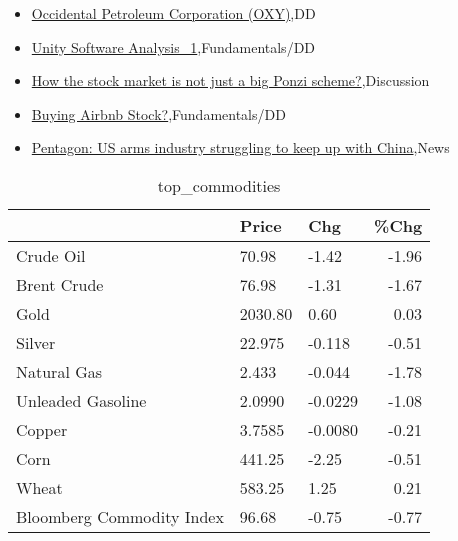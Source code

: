 \documentclass{article}%
\begin{document}
%
\begin{itemize}%
\item%
\href{https://reddit.com/r/wallstreetbets/comments/198ucu8/occidental\_petroleum\_corporation\_oxy/}{Occidental Petroleum Corporation (OXY)},DD%
\item%
\href{https://reddit.com/r/StockMarket/comments/198umep/unity\_software\_analysis\_1/}{Unity Software Analysis\_1},Fundamentals/DD%
\item%
\href{https://reddit.com/r/StockMarket/comments/198e57z/how\_the\_stock\_market\_is\_not\_just\_a\_big\_ponzi/}{How the stock market is not just a big Ponzi scheme?},Discussion%
\item%
\href{https://reddit.com/r/StockMarket/comments/198cn07/buying\_airbnb\_stock/}{Buying Airbnb Stock?},Fundamentals/DD%
\item%
\href{https://reddit.com/r/Economics/comments/198plbz/pentagon\_us\_arms\_industry\_struggling\_to\_keep\_up/}{Pentagon: US arms industry struggling to keep up with China},News%
\end{itemize}%


\begin{table}[htbp]%
\caption{top\_commodities}%
\centering%
\begin{adjustbox}{width=1\textwidth}%
\begin{tabular}{lllr}
\toprule
                          &   Price &     Chg &  \%Chg \\
\midrule
               Crude Oil  &   70.98 &   -1.42 & -1.96 \\
             Brent Crude  &   76.98 &   -1.31 & -1.67 \\
                    Gold  & 2030.80 &    0.60 &  0.03 \\
                  Silver  &  22.975 &  -0.118 & -0.51 \\
             Natural Gas  &   2.433 &  -0.044 & -1.78 \\
       Unleaded Gasoline  &  2.0990 & -0.0229 & -1.08 \\
                  Copper  &  3.7585 & -0.0080 & -0.21 \\
                    Corn  &  441.25 &   -2.25 & -0.51 \\
                   Wheat  &  583.25 &    1.25 &  0.21 \\
Bloomberg Commodity Index &   96.68 &   -0.75 & -0.77 \\
\bottomrule
\end{tabular}
%
\end{adjustbox}%
\end{table}
\end{document}
